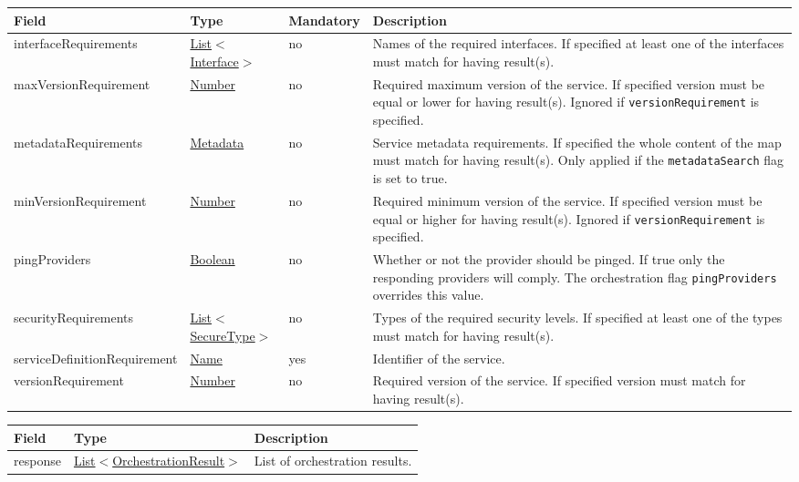 \documentclass[a4paper]{arrowhead}
\newcommand{\pref}[1]{{\textcolor{ArrowheadGrey}{\hyperref[sec:model:primitives:#1]{#1}}}}
\begin{document}
\clearpage

\label{sec:model:SQF}

\begin{table}[ht!]
\begin{tabularx}{\textwidth}{| p{5cm} | p{3cm} | p{2cm} | X |} \hline
\rowcolor{gray!33} Field & Type & Mandatory & Description \\ \hline
interfaceRequirements &\pref{List}$<$\pref{Interface}$>$ & no & Names of the required interfaces. If specified at least one of the interfaces must match for having result(s). \\ \hline
maxVersionRequirement &\pref{Number} & no & Required maximum version of the service. If specified version must be equal or lower for having result(s). Ignored if \texttt{versionRequirement} is specified. \\ \hline
metadataRequirements &\hyperref[sec:model:Metadata]{Metadata} & no & Service metadata requirements. If spe\-cified the whole content of the map must match for having result(s). Only applied if the \texttt{metadataSearch} flag is set to true. \\ \hline
minVersionRequirement &\pref{Number} & no & Required minimum version of the service. If specified version must be equal or higher for having result(s). Ignored if \texttt{versionRequirement} is specified. \\ \hline
pingProviders &\pref{Boolean} & no & Whether or not the provider should be pinged. If true only the responding providers will comply. The orchestration flag \texttt{pingProviders} overrides this value. \\ \hline
securityRequirements &\pref{List}$<$\pref{SecureType}$>$ & no & Types of the required security levels. If specified at least one of the types must match for having result(s). \\ \hline
serviceDefinitionRequirement &\pref{Name} & yes & Identifier of the service. \\ \hline
versionRequirement &\pref{Number} & no & Required version of the service. If spe\-cified version must match for having result(s). \\ \hline
\end{tabularx}
\end{table}

\label{sec:model:OrchestrationResultList}

\begin{table}[ht!]
\begin{tabularx}{\textwidth}{| p{3cm} | p{6cm} | X |} \hline
\rowcolor{gray!33} Field & Type & Description \\ \hline
response & \pref{List}$<$\hyperref[sec:model:OrchestrationResult]{OrchestrationResult}$>$ & List of orchestration results. \\ \hline
\end{tabularx}
\end{table}
\end{document}
